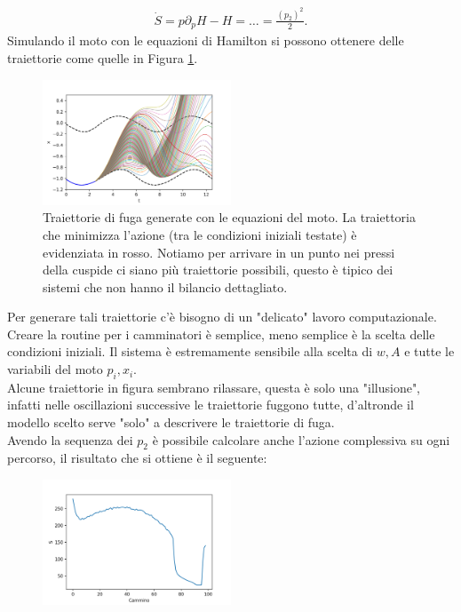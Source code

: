 \begin{exmp}[]
    \[\begin{aligned}
	\dot{S} = p\partial_{p}H-H=\ldots=\frac{(p_2)^2}{2}
    .\end{aligned}\]
    Simulando il moto con le equazioni di Hamilton si possono ottenere delle traiettorie come quelle in Figura \ref{fig:figures-lez_12_strange_motion-png}.
    \begin{figure}[H]
        \centering
	\includegraphics[width=0.5\textwidth]{figures/lez_12_strange_motion.png}
	\caption{\scriptsize Traiettorie di fuga generate con le equazioni del moto. La traiettoria che minimizza l'azione (tra le condizioni iniziali testate) è evidenziata in rosso. Notiamo per arrivare in un punto nei pressi della cuspide ci siano più traiettorie possibili, questo è tipico dei sistemi che non hanno il bilancio dettagliato.}
        \label{fig:figures-lez_12_strange_motion-png}
    \end{figure}
    \noindent
    Per generare tali traiettorie c'è bisogno di un "delicato" lavoro computazionale.
    Creare la routine per i camminatori è semplice, meno semplice è la scelta delle condizioni iniziali.
    Il sistema è estremamente sensibile alla scelta di $w, A$ e tutte le variabili del moto $p_i, x_i$. \\
    Alcune traiettorie in figura sembrano rilassare, questa è solo una "illusione", infatti nelle oscillazioni successive le traiettorie fuggono tutte, d'altronde il modello scelto serve "solo" a descrivere le traiettorie di fuga.\\ 
    Avendo la sequenza dei $p_2$ è possibile calcolare anche l'azione complessiva su ogni percorso, il risultato che si ottiene è il seguente:
    \begin{figure}[H]
        \centering
	\includegraphics[width=0.5\textwidth]{figures/lez_12_strange_motion_action.png}

\end{figure}
\end{exmp}
